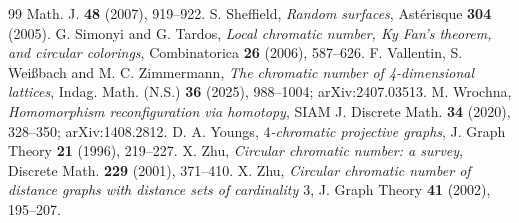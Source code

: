 \documentclass[11pt,a4paper]{amsart}
\theoremstyle{definition}
\begin{document}
\begin{thebibliography}{99}
Math. J. \textbf{48} (2007), 919--922.
 S. Sheffield, \emph{Random surfaces}, Ast\'erisque \textbf{304} (2005).
 G. Simonyi and G. Tardos, \emph{Local chromatic number, Ky Fan's theorem, and circular colorings},
Combinatorica \textbf{26} (2006), 587--626.
 F. Vallentin, S. Wei{\ss}bach and M. C. Zimmermann, \emph{The chromatic number of 4-dimensional
lattices}, Indag. Math. (N.S.) \textbf{36} (2025), 988--1004; arXiv:2407.03513.
 M. Wrochna, \emph{Homomorphism reconfiguration via homotopy}, SIAM J. Discrete Math.
\textbf{34} (2020), 328--350; arXiv:1408.2812.
 D. A. Youngs, \emph{$4$-chromatic projective graphs}, J. Graph Theory \textbf{21} (1996),
219--227.
 X. Zhu, \emph{Circular chromatic number: a survey}, Discrete Math. \textbf{229} (2001),
371--410.
 X. Zhu, \emph{Circular chromatic number of distance graphs with distance sets of cardinality $3$},
J. Graph Theory \textbf{41} (2002), 195--207.
\end{thebibliography}
\end{document}
